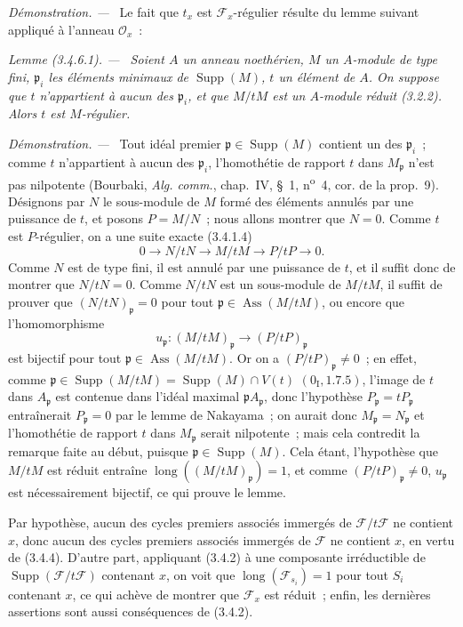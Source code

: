 \documentclass[10pt,oneside]{book}
\newenvironment{lemma}[1][]{%
  \par\medskip\noindent\itshape Lemme (#1). ---\ }{\par}
\newenvironment{proof}{%
  \par\medskip\noindent\textit{Démonstration. ---\ }}{\par}
\begin{document}
\begin{proof}
Le fait que $t_x$ est $\mathcal F_x$-régulier résulte du lemme suivant appliqué
à l'anneau $\mathcal O_x$~:

\begin{lemma}[3.4.6.1]
\label{IV.2.3.4.6.1-fr}
Soient $A$ un anneau noethérien, $M$ un $A$-module de type fini,
$\mathfrak p_i$ les éléments minimaux de $\operatorname{Supp}(M)$, $t$ un
élément de $A$. On suppose que $t$ n'appartient à aucun des $\mathfrak p_i$,
et que $M/tM$ est un $A$-module réduit (3.2.2). Alors $t$ est $M$-régulier.
\end{lemma}

\begin{proof}
Tout idéal premier $\mathfrak p\in\operatorname{Supp}(M)$ contient un des
$\mathfrak p_i$~; comme $t$ n'appartient à aucun des $\mathfrak p_i$,
l'homothétie de rapport $t$ dans $M_{\mathfrak p}$ n'est pas nilpotente
(Bourbaki, \emph{Alg. comm.}, chap.~IV, \S~1, n\textsuperscript{o}~4, cor. de
la prop.~9). Désignons par $N$ le sous-module de $M$ formé des éléments
annulés par une puissance de $t$, et posons $P=M/N$~; nous allons montrer que
$N=0$. Comme $t$ est $P$-régulier, on a une suite exacte (3.4.1.4)
\[
0\longrightarrow N/tN\longrightarrow M/tM\longrightarrow P/tP
\longrightarrow0.
\]
Comme $N$ est de type fini, il est annulé par une puissance de $t$, et il
suffit donc de montrer que $N/tN=0$. Comme $N/tN$ est un sous-module de
$M/tM$, il suffit de prouver que $(N/tN)_{\mathfrak p}=0$ pour tout
$\mathfrak p\in\operatorname{Ass}(M/tM)$, ou encore que l'homomorphisme
\[
u_{\mathfrak p}:(M/tM)_{\mathfrak p}\longrightarrow(P/tP)_{\mathfrak p}
\]
est bijectif pour tout $\mathfrak p\in\operatorname{Ass}(M/tM)$. Or on a
$(P/tP)_{\mathfrak p}\neq0$~; en effet, comme
$\mathfrak p\in\operatorname{Supp}(M/tM)
=\operatorname{Supp}(M)\cap V(t)$ $(0_{\mathrm I},1.7.5)$, l'image de $t$ dans
$A_{\mathfrak p}$ est contenue dans l'idéal maximal
$\mathfrak pA_{\mathfrak p}$, donc l'hypothèse
$P_{\mathfrak p}=tP_{\mathfrak p}$ entraînerait $P_{\mathfrak p}=0$ par le
lemme de Nakayama~; on aurait donc $M_{\mathfrak p}=N_{\mathfrak p}$ et
l'homothétie de rapport $t$ dans $M_{\mathfrak p}$ serait nilpotente~; mais
cela contredit la remarque faite au début, puisque
$\mathfrak p\in\operatorname{Supp}(M)$. Cela étant, l'hypothèse que $M/tM$ est
réduit entraîne $\operatorname{long}((M/tM)_{\mathfrak p})=1$, et comme
$(P/tP)_{\mathfrak p}\neq0$, $u_{\mathfrak p}$ est nécessairement bijectif,
ce qui prouve le lemme.
\end{proof}

Par hypothèse, aucun des cycles premiers associés immergés de
$\mathcal F/t\mathcal F$ ne contient $x$, donc aucun des cycles premiers
associés immergés de $\mathcal F$ ne contient $x$, en vertu de (3.4.4).
D'autre part, appliquant (3.4.2) à une composante irréductible de
$\operatorname{Supp}(\mathcal F/t\mathcal F)$ contenant $x$, on voit que
$\operatorname{long}(\mathcal F_{s_i})=1$ pour tout $S_i$ contenant $x$, ce
qui achève de montrer que $\mathcal F_x$ est réduit~; enfin, les dernières
assertions sont aussi conséquences de (3.4.2).
\end{proof}
\end{document}
